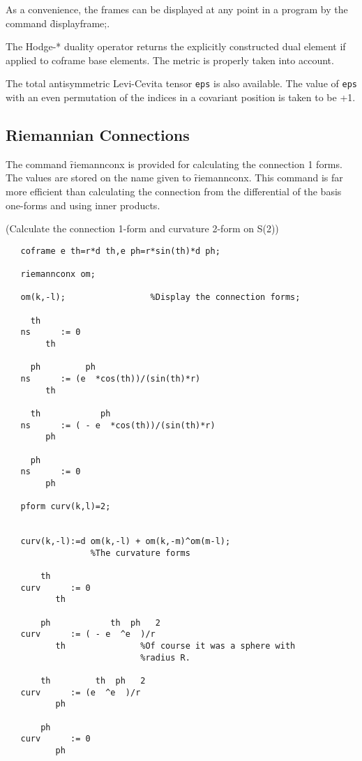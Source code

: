  
\hypertarget{command:DISPLAYFRAME}{}
As a convenience, the frames can be displayed at any point in a program
by the command \f{displayframe;}\label{DISPLAYFRAME}.

The Hodge-* duality operator returns the explicitly constructed dual
element if applied to coframe base elements. The metric is properly
taken into account.

 
The total antisymmetric Levi-Cevita tensor \texttt{eps}\label{EPS} is
also available.  The value of \texttt{eps} with an even permutation of the
indices in a covariant position is taken to be +1.


\subsection{Riemannian Connections}

The command \f{riemannconx} is provided for calculating the
 \label{RIEMANNCONX}
\hypertarget{command:RIEMANNCONX}{}
connection 1 forms.  The values are stored on the name given to
\f{riemannconx}.  This command is far more efficient than calculating the
connection from the differential of the basis one-forms and using
inner products.

\example (Calculate the connection 1-form and curvature 2-form on S(2))

\begin{verbatim}
   coframe e th=r*d th,e ph=r*sin(th)*d ph;

   riemannconx om;

   om(k,-l);                 %Display the connection forms;

     th
   ns      := 0
        th

     ph         ph
   ns      := (e  *cos(th))/(sin(th)*r)
        th

     th            ph
   ns      := ( - e  *cos(th))/(sin(th)*r)
        ph

     ph
   ns      := 0
        ph

   pform curv(k,l)=2;


   curv(k,-l):=d om(k,-l) + om(k,-m)^om(m-l);
                 %The curvature forms

       th
   curv      := 0
          th

       ph            th  ph   2
   curv      := ( - e  ^e  )/r
          th               %Of course it was a sphere with
                           %radius R.

       th         th  ph   2
   curv      := (e  ^e  )/r
          ph

       ph
   curv      := 0
          ph
\end{verbatim}

